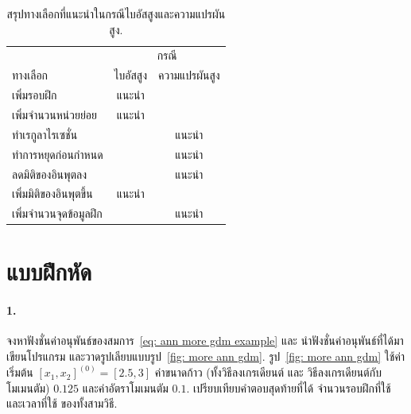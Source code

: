 
\begin{table}[hbtp]
{\footnotesize %
\caption{สรุปทางเลือกที่แนะนำในกรณีไบอัสสูงและความแปรผันสูง.}
\label{tbl: ann tips options by bias variance}
\begin{center}
\begin{tabular}{|l|c|c|}
\hline 
       & \multicolumn{2}{|c|}{กรณี} \\
       \cline{2-3}
ทางเลือก & ไบอัสสูง & ความแปรผันสูง \\
\hline
เพิ่มรอบฝึก            & แนะนำ      &   \\
เพิ่มจำนวนหน่วยย่อย     & แนะนำ      &   \\
ทำเรกูลาไรเซชั่น        &           & แนะนำ \\
ทำการหยุดก่อนกำหนด    &           & แนะนำ \\
ลดมิติของอินพุตลง       &           & แนะนำ \\
เพิ่มมิติของอินพุตขึ้น      & แนะนำ      &  \\
เพิ่มจำนวนจุดข้อมูลฝึก     &             & แนะนำ \\
%
\hline
\end{tabular} 
\end{center}
}%
\end{table}



\section{แบบฝึกหัด}
\label{section: ANN more exercises}

\paragraph{1.} จงหาฟังชั่นค่าอนุพันธ์ของสมการ~\ref{eq: ann more gdm example} และ นำฟังชั่นค่าอนุพันธ์ที่ได้มาเขียนโปรแกรม และวาดรูปเลียบแบบรูป~\ref{fig: more ann gdm}.
รูป~\ref{fig: more ann gdm} ใช้ค่าเริ่มต้น $[x_1, x_2]^{(0)} = [2.5, 3]$ ค่าขนาดก้าว (ทั้งวิธีลงเกรเดียนต์ และ วิธีลงเกรเดียนต์กับโมเมนตัม) $0.125$ และค่าอัตราโมเมนตัม $0.1$.
เปรียบเทียบคำตอบสุดท้ายที่ได้ จำนวนรอบฝึกที่ใช้ และเวลาที่ใช้ ของทั้งสามวิธี.

